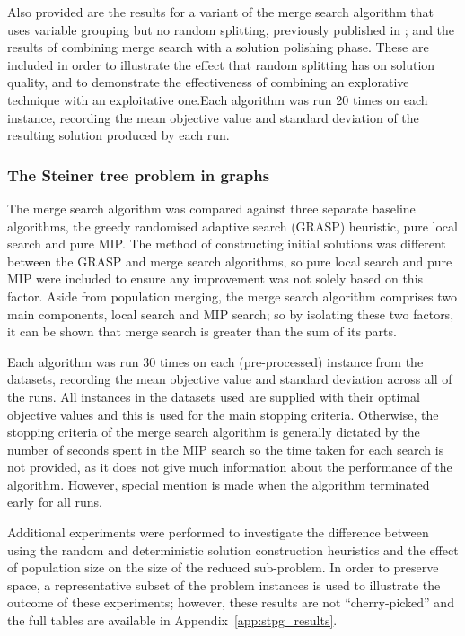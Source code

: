 \documentclass[preprint]{elsarticle}
\begin{document}
Also provided are the results for a variant of the merge search algorithm that uses variable grouping but no random splitting, previously published in \citet{gecco18}; and the results of combining merge search with a solution polishing phase. These are included in order to illustrate the effect that random splitting has on solution quality, and to demonstrate the effectiveness of combining an explorative technique with an exploitative one.Each algorithm was run 20 times on each instance, recording the mean objective value and standard deviation of the resulting solution produced by each run. 

\subsubsection*{\textbf{The Steiner tree problem in graphs}}
The merge search algorithm was compared against three separate baseline algorithms, the greedy randomised adaptive search (GRASP) heuristic, pure local search and pure MIP. The method of constructing initial solutions was different between the GRASP and merge search algorithms, so pure local search and pure MIP were included to ensure any improvement was not solely based on this factor. Aside from population merging, the merge search algorithm comprises two main components, local search and MIP search; so by isolating these two factors, it can be shown that merge search is greater than the sum of its parts.

Each algorithm was run 30 times on each (pre-processed) instance from the datasets, recording the mean objective value and standard deviation across all of the runs. All instances in the datasets used are supplied with their optimal objective values and this is used for the main stopping criteria. Otherwise, the stopping criteria of the merge search algorithm is generally dictated by the number of seconds spent in the MIP search so the time taken for each search is not provided, as it does not give much information about the performance of the algorithm. However, special mention is made when the algorithm terminated early for all runs.


Additional experiments were performed to investigate the difference between using the random and deterministic solution construction heuristics and the effect of population size on the size of the reduced sub-problem. In order to preserve space, a representative subset of the problem instances is used to illustrate the outcome of these experiments; however, these results are not ``cherry-picked'' and the full tables are available in Appendix~\ref{app:stpg_results}. 
\end{document}

